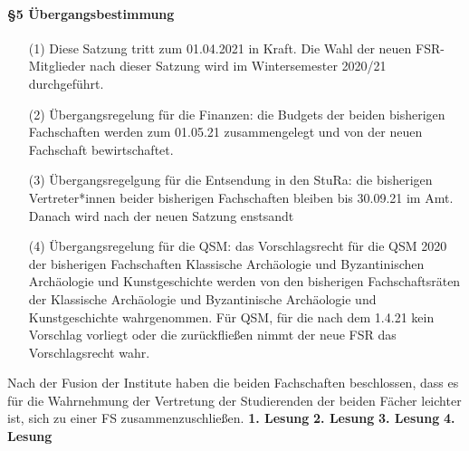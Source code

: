 {    \paragraph{§5 Übergangsbestimmung}
    \begin{enumerate}
        \item[(1)] Diese  Satzung  tritt  zum  01.04.2021  in  Kraft.  Die  Wahl  der  neuen  FSR-Mitglieder  nach dieser Satzung wird im Wintersemester 2020/21 durchgeführt.
        \item[(2)] Übergangsregelung  für  die  Finanzen:  die  Budgets  der  beiden  bisherigen  Fachschaften werden zum 01.05.21 zusammengelegt und von der neuen Fachschaft bewirtschaftet.
        \item[(3)] Übergangsregelgung für die Entsendung in den StuRa: die bisherigen Vertreter*innen beider bisherigen Fachschaften bleiben bis 30.09.21 im Amt. Danach wird nach der neuen Satzung enstsandt
        \item[(4)] Übergangsregelung  für  die  QSM:  das  Vorschlagsrecht  für  die  QSM  2020  der  bisherigen Fachschaften Klassische Archäologie und Byzantinischen Archäologie und Kunstgeschichte werden von den bisherigen Fachschaftsräten der Klassische Archäologie und Byzantinische Archäologie und Kunstgeschichte wahrgenommen. Für QSM, für die nach dem 1.4.21 kein Vorschlag vorliegt oder die zurückfließen nimmt der neue FSR das Vorschlagsrecht wahr.  
    \end{enumerate}
}{
    Nach der Fusion der Institute haben die beiden Fachschaften beschlossen, dass es für die Wahrnehmung der Vertretung der Studierenden der beiden Fächer leichter ist, sich zu einer FS zusammenzuschließen.
}{
    \textbf{1. Lesung}
    \ul{
    }
    \textbf{2. Lesung}
    \ul{
    }
    \textbf{3. Lesung}
    \ul{
    }
    \textbf{4. Lesung}
    \ul{
    }
}{

}
\iffalse
{}
